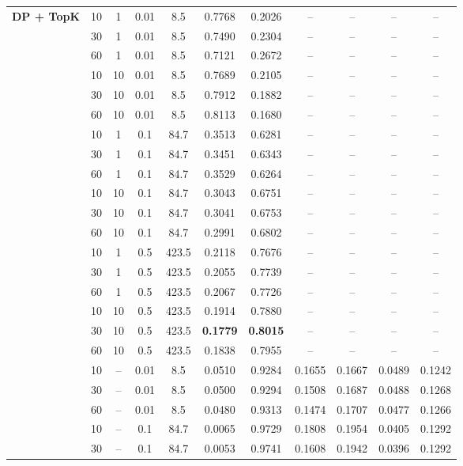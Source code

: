 \documentclass[11pt,twocolumn,a4paper,DIV=calc,parskip=half]{scrartcl}
\begin{document}
\begin{longtable}{@{}l c c c c c c c c c c@{}}
	\multirow{18}{*}{\textbf{DP + TopK}} & 10 & 1 & 0.01 & 8.5 & 0.7768 & 0.2026 & -- & -- & -- & -- \\
	& 30 & 1 & 0.01 & 8.5 & 0.7490 & 0.2304 & -- & -- & -- & -- \\
	& 60 & 1 & 0.01 & 8.5 & 0.7121 & 0.2672 & -- & -- & -- & -- \\
	& 10 & 10 & 0.01 & 8.5 & 0.7689 & 0.2105 & -- & -- & -- & -- \\
	& 30 & 10 & 0.01 & 8.5 & 0.7912 & 0.1882 & -- & -- & -- & -- \\
	& 60 & 10 & 0.01 & 8.5 & 0.8113 & 0.1680 & -- & -- & -- & -- \\
	& 10 & 1 & 0.1 & 84.7 & 0.3513 & 0.6281 & -- & -- & -- & -- \\
	& 30 & 1 & 0.1 & 84.7 & 0.3451 & 0.6343 & -- & -- & -- & -- \\
	& 60 & 1 & 0.1 & 84.7 & 0.3529 & 0.6264 & -- & -- & -- & -- \\
	& 10 & 10 & 0.1 & 84.7 & 0.3043 & 0.6751 & -- & -- & -- & -- \\
	& 30 & 10 & 0.1 & 84.7 & 0.3041 & 0.6753 & -- & -- & -- & -- \\
	& 60 & 10 & 0.1 & 84.7 & 0.2991 & 0.6802 & -- & -- & -- & -- \\
	& 10 & 1 & 0.5 & 423.5 & 0.2118 & 0.7676 & -- & -- & -- & -- \\
	& 30 & 1 & 0.5 & 423.5 & 0.2055 & 0.7739 & -- & -- & -- & -- \\
	& 60 & 1 & 0.5 & 423.5 & 0.2067 & 0.7726 & -- & -- & -- & -- \\
	& 10 & 10 & 0.5 & 423.5 & 0.1914 & 0.7880 & -- & -- & -- & -- \\
	& 30 & 10 & 0.5 & 423.5 & \textbf{0.1779} & \textbf{0.8015} & -- & -- & -- & -- \\
	& 60 & 10 & 0.5 & 423.5 & 0.1838 & 0.7955 & -- & -- & -- & -- \\
	\arrayrulecolor{gray!60}\midrule\arrayrulecolor{black}
	\multirow{9}{*}{\textbf{FLTrust + TopK}} & 10 & -- & 0.01 & 8.5 & 0.0510 & 0.9284 & 0.1655 & 0.1667 & 0.0489 & 0.1242 \\
	& 30 & -- & 0.01 & 8.5 & 0.0500 & 0.9294 & 0.1508 & 0.1687 & 0.0488 & 0.1268 \\
	& 60 & -- & 0.01 & 8.5 & 0.0480 & 0.9313 & 0.1474 & 0.1707 & 0.0477 & 0.1266 \\
	& 10 & -- & 0.1 & 84.7 & 0.0065 & 0.9729 & 0.1808 & 0.1954 & 0.0405 & 0.1292 \\
	& 30 & -- & 0.1 & 84.7 & 0.0053 & 0.9741 & 0.1608 & 0.1942 & 0.0396 & 0.1292 \\

\end{longtable}
\end{document}
